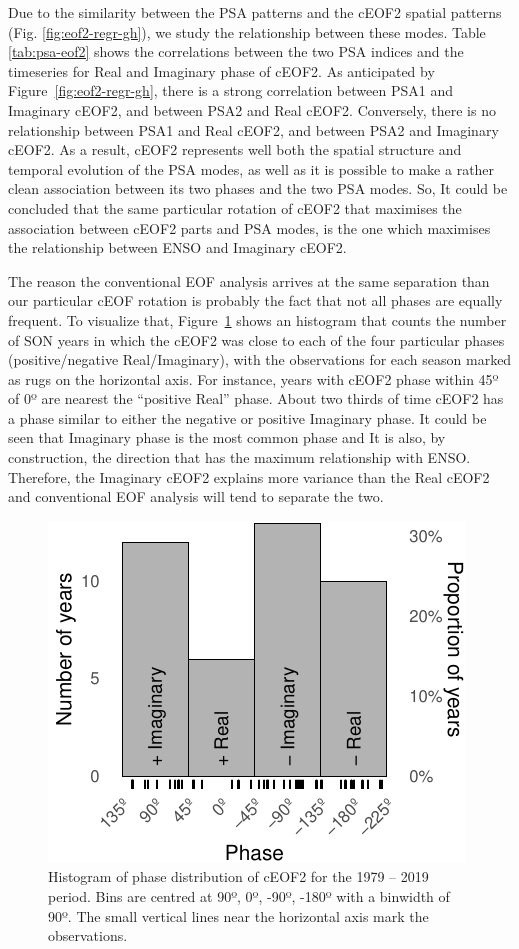 \documentclass[smallextended]{svjour3}       %
\begin{document}
Due to the similarity between the PSA patterns and the cEOF2 spatial patterns (Fig. \ref{fig:eof2-regr-gh}), we study the relationship between these modes.
Table \ref{tab:psa-eof2} shows the correlations between the two PSA indices and the timeseries for Real and Imaginary phase of cEOF2.
As anticipated by Figure~\ref{fig:eof2-regr-gh}, there is a strong correlation between PSA1 and Imaginary cEOF2, and between PSA2 and Real cEOF2.
Conversely, there is no relationship between PSA1 and Real cEOF2, and between PSA2 and Imaginary cEOF2.
As a result, cEOF2 represents well both the spatial structure and temporal evolution of the PSA modes, as well as it is possible to make a rather clean association between its two phases and the two PSA modes.
So, It could be concluded that the same particular rotation of cEOF2 that maximises the association between cEOF2 parts and PSA modes, is the one which maximises the relationship between ENSO and Imaginary cEOF2.

The reason the conventional EOF analysis arrives at the same separation than our particular cEOF rotation is probably the fact that not all phases are equally frequent.
To visualize that, Figure~\ref{fig:phase-histogram} shows an histogram that counts the number of SON years in which the cEOF2 was close to each of the four particular phases (positive/negative Real/Imaginary), with the observations for each season marked as rugs on the horizontal axis.
For instance, years with cEOF2 phase within 45º of 0º are nearest the ``positive Real'' phase.
About two thirds of time cEOF2 has a phase similar to either the negative or positive Imaginary phase.
It could be seen that Imaginary phase is the most common phase and It is also, by construction, the direction that has the maximum relationship with ENSO.
Therefore, the Imaginary cEOF2 explains more variance than the Real cEOF2 and conventional EOF analysis will tend to separate the two.



\begin{figure}
\centering
\includegraphics{../figures/phase-histogram-1.pdf}
\caption{\label{fig:phase-histogram}Histogram of phase distribution of cEOF2 for the 1979 -- 2019 period. Bins are centred at 90º, 0º, -90º, -180º with a binwidth of 90º. The small vertical lines near the horizontal axis mark the observations.}
\end{figure}
\end{document}
